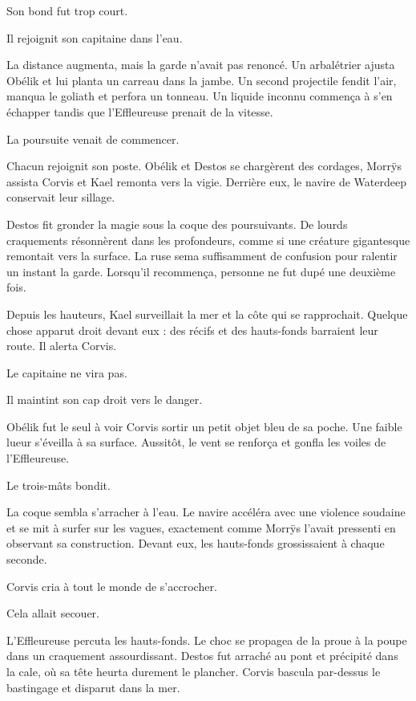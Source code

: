 Son bond fut trop court.

Il rejoignit son capitaine dans l'eau.

La distance augmenta, mais la garde n'avait pas renoncé. Un arbalétrier ajusta Obélik et lui planta un carreau dans la jambe. Un second projectile fendit l'air, manqua le goliath et perfora un tonneau. Un liquide inconnu commença à s'en échapper tandis que l'Effleureuse prenait de la vitesse.

La poursuite venait de commencer.

Chacun rejoignit son poste. Obélik et Destos se chargèrent des cordages, Morrÿs assista Corvis et Kael remonta vers la vigie. Derrière eux, le navire de Waterdeep conservait leur sillage.

Destos fit gronder la magie sous la coque des poursuivants. De lourds craquements résonnèrent dans les profondeurs, comme si une créature gigantesque remontait vers la surface. La ruse sema suffisamment de confusion pour ralentir un instant la garde. Lorsqu'il recommença, personne ne fut dupé une deuxième fois.

Depuis les hauteurs, Kael surveillait la mer et la côte qui se rapprochait. Quelque chose apparut droit devant eux : des récifs et des hauts-fonds barraient leur route. Il alerta Corvis.

Le capitaine ne vira pas.

Il maintint son cap droit vers le danger.

\scenebreak

Obélik fut le seul à voir Corvis sortir un petit objet bleu de sa poche. Une faible lueur s'éveilla à sa surface. Aussitôt, le vent se renforça et gonfla les voiles de l'Effleureuse.

Le trois-mâts bondit.

La coque sembla s'arracher à l'eau. Le navire accéléra avec une violence soudaine et se mit à surfer sur les vagues, exactement comme Morrÿs l'avait pressenti en observant sa construction. Devant eux, les hauts-fonds grossissaient à chaque seconde.

Corvis cria à tout le monde de s'accrocher.

Cela allait secouer.

L'Effleureuse percuta les hauts-fonds. Le choc se propagea de la proue à la poupe dans un craquement assourdissant. Destos fut arraché au pont et précipité dans la cale, où sa tête heurta durement le plancher. Corvis bascula par-dessus le bastingage et disparut dans la mer.

